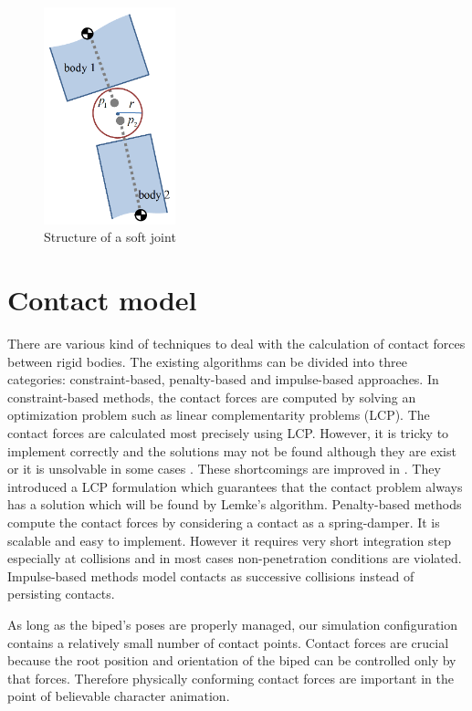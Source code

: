 \documentclass[master,english,final]{kaist-ucs}
\begin{document}
\begin{figure}[h!]
  \centering
  \includegraphics[width=1.5in]{softjoint}
  \caption{Structure of a soft joint}
\end{figure}


\section{Contact model}

There are various kind of techniques to deal with the calculation of contact forces between rigid bodies.
The existing algorithms can be divided into three categories: constraint-based, penalty-based and impulse-based approaches.
In constraint-based methods, the contact forces are computed by solving an optimization problem such as linear complementarity problems (LCP).
The contact forces are calculated most precisely using LCP.
However, it is tricky to implement correctly and the solutions may not be found although they are exist or it is unsolvable in some cases \cite{StewartT00}.
These shortcomings are improved in \cite{Anitescu}.
They introduced a LCP formulation which guarantees that the contact problem always has a solution which will be found by Lemke's algorithm.
Penalty-based methods compute the contact forces by considering a contact as a spring-damper.
It is scalable and easy to implement. However it requires very short integration step especially at collisions and in most cases non-penetration conditions are violated.
Impulse-based methods model contacts as successive collisions instead of persisting contacts.

As long as the biped's poses are properly managed, our simulation configuration contains a relatively small number of contact points.
Contact forces are crucial because the root position and orientation of the biped can be controlled only by that forces.
Therefore physically conforming contact forces are important in the point of believable character animation.
\end{document}
